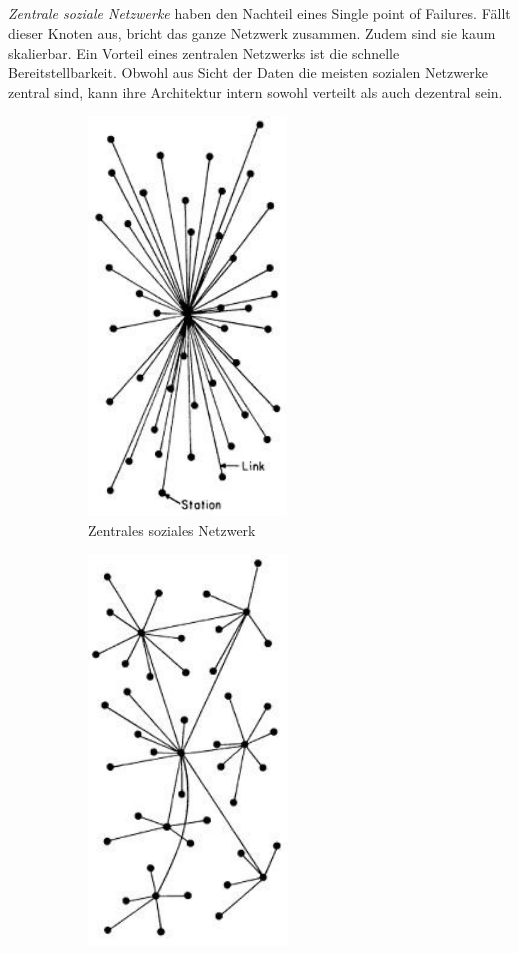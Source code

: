 	\subsection{
		\label{sub:difference}
	}
	\textit{Zentrale soziale Netzwerke} haben den Nachteil eines \glqq Single point of Failures\grqq. Fällt dieser Knoten aus, bricht das ganze Netzwerk zusammen. Zudem sind sie kaum skalierbar. Ein Vorteil eines zentralen Netzwerks ist die schnelle Bereitstellbarkeit. Obwohl aus Sicht der Daten die meisten sozialen Netzwerke zentral sind, kann ihre Architektur intern sowohl verteilt als auch dezentral sein.
	\begin{figure}[h] 
		\centering
		\begin{subfigure}[t]{0.4\linewidth}
			\centering
			\includegraphics[width=0.4\linewidth]{figures/centralized-network.png}
			\caption{Zentrales soziales Netzwerk}
			\label{fig:central-network}
		\end{subfigure}
		\begin{subfigure}[t]{0.4\linewidth}
			\centering
			\includegraphics[width=0.4\linewidth]{figures/decentralized-network.png}

\end{subfigure}
\end{figure}
